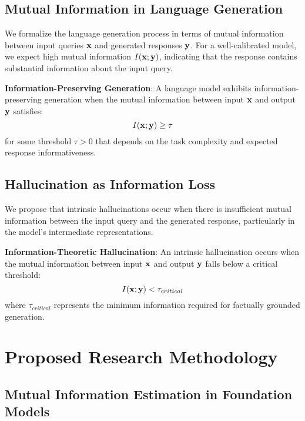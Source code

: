\subsection{Mutual Information in Language Generation}
\label{subsec:mi_generation}

We formalize the language generation process in terms of mutual information between input queries ${\mathbf{x}}$ and generated responses ${\mathbf{y}}$. For a well-calibrated model, we expect high mutual information $I({\mathbf{x}}; {\mathbf{y}})$, indicating that the response contains substantial information about the input query.

\begin{definition}
\textbf{Information-Preserving Generation}: A language model exhibits information-preserving generation when the mutual information between input ${\mathbf{x}}$ and output ${\mathbf{y}}$ satisfies:
\[
I({\mathbf{x}}; {\mathbf{y}}) \geq \tau
\]
for some threshold $\tau > 0$ that depends on the task complexity and expected response informativeness.
\label{def:info_preserving}
\end{definition}

\subsection{Hallucination as Information Loss}
\label{subsec:hall_info_loss}

We propose that intrinsic hallucinations occur when there is insufficient mutual information between the input query and the generated response, particularly in the model's intermediate representations.

\begin{definition}
\textbf{Information-Theoretic Hallucination}: An intrinsic hallucination occurs when the mutual information between input ${\mathbf{x}}$ and output ${\mathbf{y}}$ falls below a critical threshold:
\[
I({\mathbf{x}}; {\mathbf{y}}) < \tau_{critical}
\]
where $\tau_{critical}$ represents the minimum information required for factually grounded generation.
\label{def:it_hallucination}
\end{definition}

\section{Proposed Research Methodology}
\label{sec:methodology}

\subsection{Mutual Information Estimation in Foundation Models}
\label{subsec:mi_estimation}

